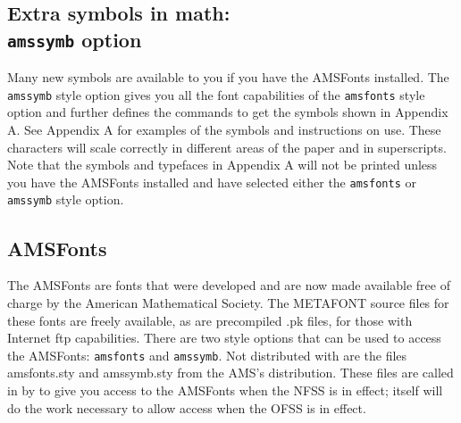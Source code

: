 \subsection[Extra symbols in math: {\protect\tt amssymb} option]%
{Extra symbols in math:\protect\\ {\protect\tt amssymb} option}

Many new symbols are available to you if you have the AMSFonts installed.
The \verb+amssymb+ style option gives you all the font capabilities of the
\verb+amsfonts+ style option and further defines the commands to get the
symbols shown in Appendix A. See Appendix A for examples of the symbols and
instructions on use. These characters will scale correctly in different
areas of the paper and in superscripts. Note that the symbols and typefaces
in Appendix A will not be printed unless you have the AMSFonts installed
and have selected either the \verb+amsfonts+ or \verb+amssymb+ style
option.

\subsection{AMSFonts}
\label{AMSFonts}

The AMSFonts are fonts that were developed and are now made available free
of charge by the American Mathematical Society. The METAFONT source files
for  these fonts are freely available, as are
precompiled .pk files, for those with Internet ftp capabilities. There are
two style options that can be used to access the AMSFonts: \verb+amsfonts+
and \verb+amssymb+.  Not distributed with \REVTeX{} are the files
amsfonts.sty and amssymb.sty from the AMS's \AmSLaTeX{} distribution. These
files are called in by \REVTeX{} to give you access to the AMSFonts when
the NFSS is in effect; \REVTeX{} itself will do the work necessary to allow
access when the OFSS is in effect.

